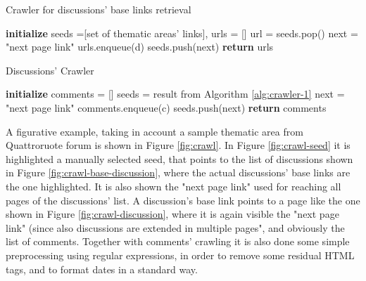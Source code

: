 \begin{algorithm}
	\caption{Crawler for discussions' base links retrieval}
	\label{alg:crawler-1}
	\begin{algorithmic}[1]
		\State \textbf{initialize} seeds =[set of thematic areas' links], urls = []
		\State
		\State url = seeds.pop()
		\State next = "next page link"
		\State urls.enqueue(d)
		\EndFor
		\State seeds.push(next)
		\EndWhile
		\State \textbf{return} urls
	\end{algorithmic}
\end{algorithm}

\begin{algorithm}
	\caption{Discussions' Crawler}
	\label{alg:crawler-2}
	\begin{algorithmic}[1]
		\State \textbf{initialize} comments = []
		\State
		\State seeds = result from Algorithm \ref{alg:crawler-1}
		\State next = "next page link"
		\State comments.enqueue(c)
		\EndFor
		\State seeds.push(next)
		\EndWhile
		\State \textbf{return} comments
	\end{algorithmic}
\end{algorithm}

A figurative example, taking in account a sample thematic area from Quattroruote forum is shown in Figure \ref{fig:crawl}. In Figure \ref{fig:crawl-seed} it is highlighted a manually selected seed, that points to the list of discussions shown in Figure \ref{fig:crawl-base-discussion}, where the actual discussions' base links are the one highlighted. It is also shown the "next page link" used for reaching all pages of the discussions' list. A discussion's base link points to a page like the one shown in Figure \ref{fig:crawl-discussion}, where it is again visible the "next page link" (since also discussions are extended in multiple pages", and obviously the list of comments.
Together with comments' crawling it is also done some simple preprocessing using regular expressions, in order to remove some residual HTML tags, and to format dates in a standard way.

